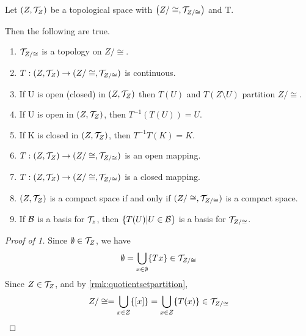 
\begin{prop}
    \label{prop:QuotientSpaceTopology}
    
    Let $(Z,\mathcal{T}_Z)$ be a topological space 
    with \QuotientTopologicalSpace  $\left( Z/\cong, \mathcal{T}_{Z/\cong}\right)$
    and \QuotientMap T.
    
    Then the following are true. 
    \begin{enumerate}
        \item $\mathcal{T}_{Z/\cong}$ is a topology on $Z/\cong$. 
        \item $T:(Z, \mathcal{T}_Z) \to (Z/\cong, \mathcal{T}_{Z/\cong})$ is continuous. 
        \item If U is open (closed) in $(Z,\mathcal{T}_Z)$ then $T(U)$ and $T(Z\setminus U)$ partition $Z/\cong$. 
        \item If U is open in $(Z, \mathcal{T}_Z)$, then $T^{-1}(T(U))=U$. 
        \item If K is closed in $(Z,\mathcal{T}_Z)$, then $T^{-1}T(K)=K$. 
        \item $T:(Z, \mathcal{T}_Z) \to (Z/\cong, \mathcal{T}_{Z/\cong})$ is an open mapping. 
        \item $T:(Z, \mathcal{T}_Z) \to (Z/\cong, \mathcal{T}_{Z/\cong})$ is a  closed mapping.
        \item $(Z, \mathcal{T}_Z)$ is a compact space if and only if $(Z/\cong, \mathcal{T}_{Z/\cong})$ is a compact space.
        \item If $\mathcal{B}$ is a basis for $\mathcal{T}_z$, then $\{T(U) | U \in \mathcal{B}\}$ is a basis for $\mathcal{T}_{Z/\cong}$. 
        
    \end{enumerate} 
    \begin{proof}[Proof of 1]
        Since $\emptyset \in \mathcal{T}_Z$, we have 
        \begin{equation}
            \emptyset = \bigcup\limits_{x \in \emptyset} \{Tx\} \in \mathcal{T}_{Z/\cong}
        \end{equation}
        Since $Z \in \mathcal{T}_Z$, and by \ref{rmk:quotientsetpartition}, 
        \begin{equation} 
            Z/\cong = \bigcup_{x \in Z} \{[x]\}= \bigcup\limits_{x \in Z} \{T(x)\} \in \mathcal{T}_{Z/\cong}
        \end{equation} 
        

\end{proof}
\end{prop}

